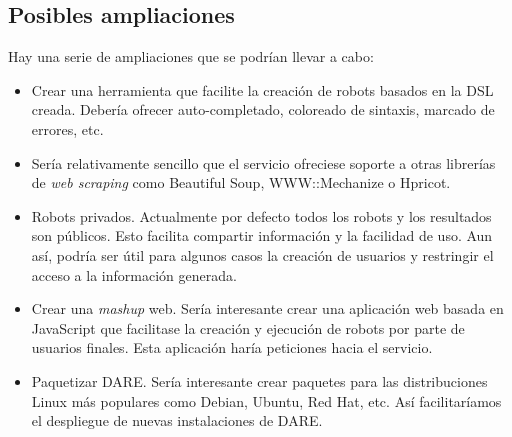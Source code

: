 \subsection{Posibles ampliaciones}

Hay una serie de ampliaciones que se podrían llevar a cabo:

\begin{itemize}
  \item Crear una herramienta que facilite la creación de robots
    basados en la DSL creada. Debería ofrecer auto-completado,
    coloreado de sintaxis, marcado de errores, etc.
  \item Sería relativamente sencillo que el servicio ofreciese soporte
    a otras librerías de \emph{web scraping} como Beautiful
    Soup\cite{SOUP}, WWW::Mechanize\cite{MECHANIZE} o
    Hpricot\cite{HPRICOT}.
  \item Robots privados. Actualmente por defecto todos los robots y
    los resultados son públicos. Esto facilita compartir información y
    la facilidad de uso. Aun así, podría ser útil para algunos casos
    la creación de usuarios y restringir el acceso a la información
    generada.
  \item Crear una \emph{mashup}\cite{MASHUP} web. Sería interesante
    crear una aplicación web basada en JavaScript que facilitase la
    creación y ejecución de robots por parte de usuarios finales. Esta
    aplicación haría peticiones hacia el servicio.
  \item Paquetizar DARE. Sería interesante crear paquetes para las
    distribuciones Linux más populares como Debian, Ubuntu, Red Hat,
    etc. Así facilitaríamos el despliegue de nuevas instalaciones de
    DARE.
\end{itemize}
